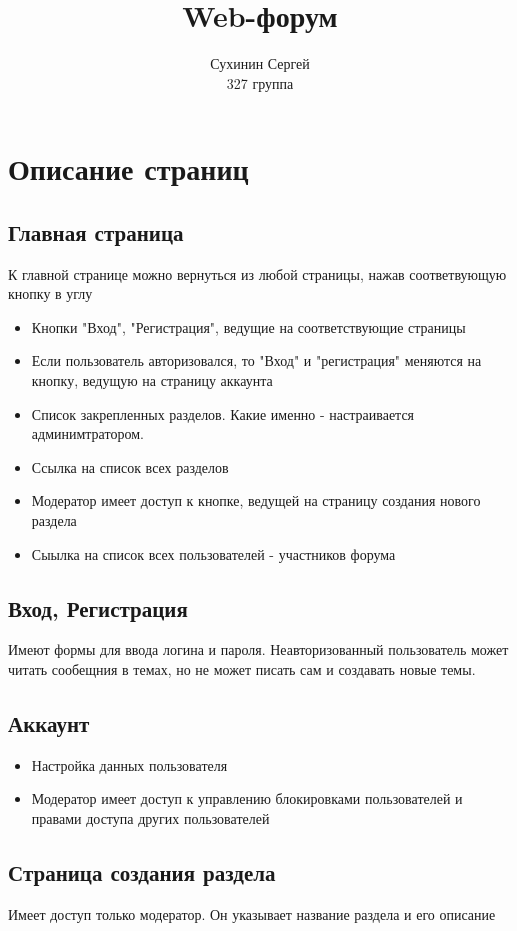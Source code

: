 \documentclass[a4paper, 12pt]{article}
\title{Web-форум}
\author{Сухинин Сергей\\ 327 группа}
\begin{document}
\maketitle



\section{Описание страниц}
	\subsection{Главная страница}
		К главной странице можно вернуться из любой страницы, нажав соответвующую кнопку в углу
		\begin{itemize}
			\item Кнопки "Вход", "Регистрация", ведущие на соответствующие страницы
			\item Если пользователь авторизовался, то "Вход" и "регистрация" меняются на кнопку, ведущую на страницу аккаунта
			\item Список закрепленных разделов. Какие именно - настраивается админимтратором.
			\item Ссылка на список всех разделов
			\item Модератор имеет доступ к кнопке, ведущей на страницу создания нового раздела
			\item Сыылка на список всех пользователей - участников форума
		\end{itemize}
		
	\subsection{Вход, Регистрация}
		Имеют формы для ввода логина и пароля. Неавторизованный пользователь может читать сообещния в темах, но не может писать сам и создавать новые темы.
		
	\subsection{Аккаунт}
		\begin{itemize}
			\item Настройка данных пользователя
			\item Модератор имеет доступ к управлению блокировками пользователей и правами доступа других пользователей
		\end{itemize}
		
	\subsection{Страница создания раздела}
		Имеет доступ только модератор. Он указывает название раздела и его описание
		
\end{document}
